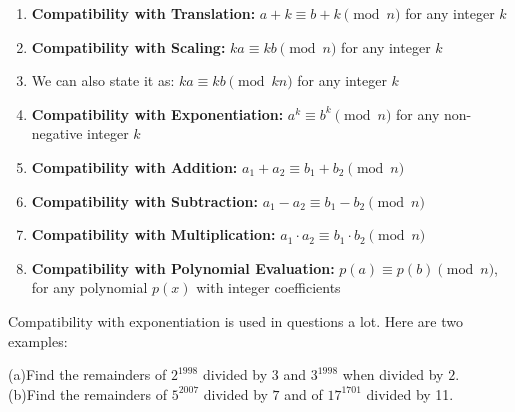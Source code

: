 \begin{theorem}
\begin{enumerate}
    \item \textbf{Compatibility with Translation:} $a + k \equiv b + k \pmod{n}$ for any integer $k$\\
    \item \textbf{Compatibility with Scaling:} $ka \equiv kb \pmod{n}$ for any integer $k$\\
    \item We can also state it as: $ka \equiv kb \pmod{kn}$ for any integer $k$\\
    \item \textbf{Compatibility with Exponentiation:} $a^k \equiv b^k \pmod{n}$ for any non-negative integer $k$
    \item \textbf{Compatibility with Addition:} $a_1 + a_2 \equiv b_1 + b_2 \pmod{n}$
    \item \textbf{Compatibility with Subtraction:} $a_1 - a_2 \equiv b_1 - b_2 \pmod{n}$
    \item \textbf{Compatibility with Multiplication:} $a_1 \cdot a_2 \equiv b_1 \cdot b_2 \pmod{n}$
    \item \textbf{Compatibility with Polynomial Evaluation:} $p(a) \equiv p(b) \pmod{n}$, for any polynomial $p(x)$ with integer coefficients

\end{enumerate}
\end{theorem}
Compatibility with exponentiation is used in questions a lot. Here are two examples:\\
\begin{example}
    (a)Find the remainders of $2^{1998}$ divided by $3$ and $3^{1998}$ when divided by $2$.\\ 
    (b)Find the remainders of $5^{2007}$ divided by $7$ and of $17^{1701}$ divided by 11.\\
\end{example}
